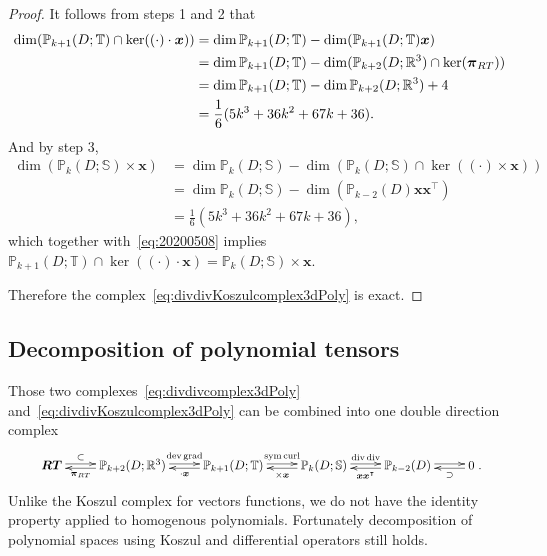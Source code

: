 \begin{proof}
\medskip
{} 

It follows from steps 1 and 2 that
\begin{align}
\dim(\mathbb P_{k+1}(D; \mathbb T)\cap\ker((\cdot)\cdot\boldsymbol x)) &= \dim\mathbb P_{k+1}(D; \mathbb T)-\dim(\mathbb P_{k+1}(D; \mathbb T)\boldsymbol x) \notag\\
&= \dim\mathbb P_{k+1}(D; \mathbb T)-\dim (\mathbb P_{k+2}(D; \mathbb R^3)\cap\ker(\boldsymbol \pi_{RT})) \notag\\
&= \dim\mathbb P_{k+1}(D; \mathbb T)-\dim \mathbb P_{k+2}(D; \mathbb R^3)+4 \notag\\
&=\frac{1}{6}(5k^3+36k^2+67k+36). \label{eq:20200508}
\end{align}
And by step 3,
\begin{align*}
\dim(\mathbb P_k(D; \mathbb S)\times\boldsymbol x)&=\dim\mathbb P_k(D; \mathbb S)-\dim(\mathbb P_k(D; \mathbb S)\cap\ker((\cdot)\times\boldsymbol x)) \\
&=\dim\mathbb P_k(D; \mathbb S)-\dim(\mathbb P_{k-2}(D)\boldsymbol x\boldsymbol  x^{\intercal}) \\
&=\frac{1}{6}(5k^3+36k^2+67k+36),
\end{align*}
which together with~\eqref{eq:20200508} implies $\mathbb P_{k+1}(D; \mathbb T)\cap\ker((\cdot)\cdot\boldsymbol x)=\mathbb P_k(D; \mathbb S)\times\boldsymbol x$.

Therefore the complex~\eqref{eq:divdivKoszulcomplex3dPoly} is exact.
\end{proof}

\subsection{Decomposition of polynomial tensors}
Those two complexes~\eqref{eq:divdivcomplex3dPoly} and~\eqref{eq:divdivKoszulcomplex3dPoly} can be combined into one double direction complex
\begin{equation*}%
\resizebox{.92\hsize}{!}{$
\xymatrix{
\boldsymbol{RT}\ar@<0.4ex>[r]^-{\subset} & \mathbb P_{k+2}(D; \mathbb R^3)\ar@<0.4ex>[r]^-{\dev\grad}\ar@<0.4ex>[l]^-{\boldsymbol \pi_{RT}} & \mathbb P_{k+1}(D; \mathbb T)\ar@<0.4ex>[r]^-{\sym\curl}\ar@<0.4ex>[l]^-{\cdot\boldsymbol x}  & \mathbb P_k(D; \mathbb S) \ar@<0.4ex>[r]^-{\div{\div}}\ar@<0.4ex>[l]^-{\times\boldsymbol x} & \mathbb P_{k-2}(D)  \ar@<0.4ex>[r]^-{} \ar@<0.4ex>[l]^-{\boldsymbol x\boldsymbol x^{\intercal}}
& 0 \ar@<0.4ex>[l]^-{\supset} }.
$}
\end{equation*}
Unlike the Koszul complex for vectors functions, we do not have the identity property applied to homogenous polynomials. Fortunately decomposition of polynomial spaces using Koszul and differential operators still holds.

